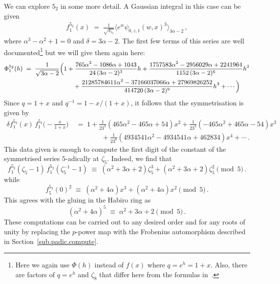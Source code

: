 \documentclass[12pt,reqno]{amsart}
\theoremstyle{definition}
\def\a{\alpha}
\def\be{\begin{equation}}
\def\ee{\end{equation}}
\def\z{\zeta}
\def\={\;=\;}
\def\cm{\;\equiv\;}
\def\Phitof{f}
\begin{document}
\medskip

We can explore $5_2$ in some more detail. A Gaussian integral in this case can be
given
\be
\begin{aligned}
\Phitof^{5_2}_1(x)
\=
\frac{1}{\sqrt{\delta_{5_2}}}
\Big\langle
e^w\psi_{0,z,1}(w,x)^3\Big\rangle_{3\alpha - 2}\,,
\end{aligned}
\ee
where $\alpha^3-\alpha^2+1=0$ and $\delta=3\alpha-2$. The first few terms of this
series are well documented\footnote{Here we again use $\Phi(h)$ instead of
  $\Phitof(x)$ where $q=e^h=1+x$. Also, there are factors of $q=e^h$ and $\z_8$
  that differ here from the formulas in~\cite[Equ. 4]{GZ:kashaev}.} but we will
give them again here:
\be
\begin{small}
\begin{aligned}
\Phi^{5_2}_1(h)
&\=
\frac{1}{\sqrt{3\alpha-2}}
\Big(1+
\frac{765\alpha^2 - 1086\alpha + 1043}{24\,(3\alpha-2)^3}h
+\frac{1757583\alpha^2 - 2956029\alpha + 2241964}{1152\,(3\alpha-2)^6}h^2\\
&\qquad\qquad\qquad\qquad
+\frac{21285784611\alpha^2 - 37166037066\alpha + 27969826252}{414720\,(3\alpha-2)^9}h^3
+\cdots\Big)
\end{aligned}
\end{small}
\ee
Since $q=1+x$ and $q^{-1}=1-x/(1+x)$, it follows that the symmetrisation is given by
\be\label{eq:52sym}
\begin{aligned}
\delta\Phitof^{5_2}_1(x)\,\Phitof^{5_2}_1\Big(-\frac{x}{1+x}\Big)
&\=
1 + \frac{1}{23^3}
(465\a^2 - 465\a + 54)x^2
+\frac{1}{23^3}
(-465\a^2 + 465\a - 54)x^3\\
&\qquad\qquad+\frac{1}{23^6}
(4934541\a^2 - 4934541\a + 462834)x^4
+\cdots\,.
\end{aligned}
\ee
This data given is enough to compute the first digit of the constant of the
symmetrised series $5$-adically at $\z_5$. Indeed, we find that
\be
\Phitof^{5_2}_1(\z_5-1)\,\Phitof^{5_2}_1(\z_{5}^{-1}-1)
\cm
(\a^2 + 3\a + 2)\z_5^3 + (\a^2 + 3\a + 2)\z_5^2
\pmod{5}\,.
\ee
while
\be
\Phitof^{5_2}_5(0)^2
\cm
(\a^2 + 4\a)x^3 + (\a^2 + 4\a)x^2
\pmod{5}\,.
\ee
This agrees with the gluing in the Habiro ring as
\be
(\a^2 + 4\a)^5
\cm
\a^2 + 3\a + 2
\pmod{5}\,.
\ee
These computations can be carried out to any desired order and for any roots of
unity by replacing the $p$-power map with the Frobenius automorphism described in
Section~\ref{sub.padic.compute}.

\medskip
\end{document}
